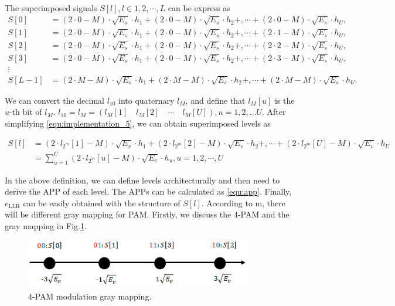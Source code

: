 The superimposed signals $S[l],l\in{1,2,\cdots,L}$ can be express as
\begin{align}
S[0] &= (2 \cdot 0-M)\cdot\sqrt{E_s}\cdot h_1 + (2\cdot0 - M)\cdot\sqrt{E_s}\cdot h_2 +, \cdots + (2 \cdot 0-M)\cdot\sqrt{E_s}\cdot h_U,
\nonumber \\
S[1] &= (2 \cdot 0-M)\cdot\sqrt{E_s}\cdot h_1 + (2\cdot0 - M)\cdot\sqrt{E_s}\cdot h_2 +, \cdots + (2 \cdot 1-M)\cdot\sqrt{E_s}\cdot h_U,
\nonumber \\
S[2] &= (2 \cdot 0-M)\cdot\sqrt{E_s}\cdot h_1 + (2\cdot0 - M)\cdot\sqrt{E_s}\cdot h_2 +, \cdots + (2 \cdot 2-M)\cdot\sqrt{E_s}\cdot h_U,
\nonumber \\
S[3] &= (2 \cdot 0-M)\cdot\sqrt{E_s}\cdot h_1 + (2\cdot0 - M)\cdot\sqrt{E_s}\cdot h_2 +, \cdots + (2 \cdot 3-M)\cdot\sqrt{E_s}\cdot h_U,
\nonumber \\
\vdots 
\nonumber \\ 
S[L-1] &= (2 \cdot M-M)\cdot\sqrt{E_s}\cdot h_1 + (2\cdot M - M)\cdot\sqrt{E_s}\cdot h_2 +, \cdots + (2 \cdot M-M)\cdot\sqrt{E_s}\cdot h_U.
\label{equ:implementation_5}
\end{align}

We can convert the decimal $l_{10}$ into quaternary $l_{M}$, and define that $l_{M}[u]$ is the $u$-th bit of $l_{M}$. $l_{10}=l_{M}=(l_M[1]  \quad l_M[2] \quad  \cdots \quad  l_M[U]),u=1,2,…U$. After simplifying \ref{equ:implementation_5}, we can obtain superimposed levels as

\begin{align}
S[l] &= (2 \cdot l_{2^{m}}[1]-M)\cdot\sqrt{E_v}\cdot h_1 + (2 \cdot l_{2^{m}}[2]-M)\cdot\sqrt{E_v}\cdot h_2 +, \cdots + (2 \cdot l_{2^{m}}[U]-M)\cdot\sqrt{E_v}\cdot h_U
\nonumber \\
&= \sum_{u=1}^{U}(2\cdot l_{2^{m}}[u]-M)\cdot\sqrt{E_{v}}\cdot h_u, u=1,2, \cdots, U
\end{align}

In the above definition, we can define levels architecturally and then need to derive the APP of each level. The APPs can be calculated as \ref{equ:app}. Finally,  $e_{\text{LLR}}$ can be easily obtained with the structure of $S[l]$. According to m, there will be different gray mapping for PAM. Firstly, we discuss the 4-PAM and the gray mapping in Fig.\ref{fig:4_pam_gray_mapping}. 

\begin{figure}
 \centering
 \includegraphics[width=10cm]{fig/4_pam_gray_mapping.png}
 \caption{4-PAM modulation gray mapping.}
 \label{fig:4_pam_gray_mapping}
\end{figure}

